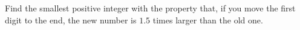 Find the smallest positive integer with the property that, if you move the first digit to the end, the new number is $1.5$ times larger than the old one.
